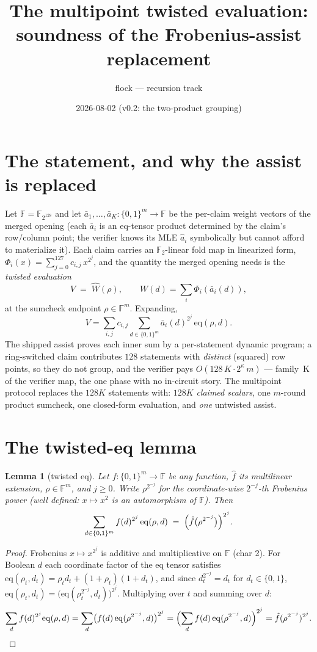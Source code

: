 \documentclass[11pt]{article}
\title{The multipoint twisted evaluation:\\ soundness of the Frobenius-assist replacement}
\author{flock — recursion track}
\date{2026-08-02 (v0.2: the two-product grouping)}
\newtheorem{lemma}{Lemma}
\newcommand{\F}{\mathbb{F}}
\newcommand{\eq}{\mathrm{eq}}
\begin{document}
\maketitle

\section{The statement, and why the assist is replaced}

Let $\F = \F_{2^{128}}$ and let $\bar a_1,\dots,\bar a_K : \{0,1\}^m \to \F$
be the per-claim weight vectors of the merged opening (each $\bar a_i$ is an
eq-tensor product determined by the claim's row/column point; the verifier
knows its MLE $\hat a_i$ symbolically but cannot afford to materialize it).
Each claim carries an $\F_2$-linear fold map in linearized form,
$\Phi_i(x) = \sum_{j=0}^{127} c_{i,j}\, x^{2^j}$, and the quantity the merged
opening needs is the \emph{twisted evaluation}
\[
  V \;=\; \widehat W(\rho), \qquad
  W(d) = \sum_i \Phi_i(\bar a_i(d)),
\]
at the sumcheck endpoint $\rho \in \F^m$. Expanding,
\[
  V = \sum_{i,j} c_{i,j} \sum_{d\in\{0,1\}^m} \bar a_i(d)^{2^j}\,\eq(\rho,d).
\]
The shipped assist proves each inner sum by a per-statement dynamic program;
a ring-switched claim contributes $128$ statements with \emph{distinct}
(squared) row points, so they do not group, and the verifier pays
$O(128\,K\cdot 2^{\kappa}\, m)$ — family~K of the verifier map, the one
phase with no in-circuit story. The multipoint protocol replaces the $128K$
statements with: $128K$ \emph{claimed scalars}, one $m$-round product
sumcheck, one closed-form evaluation, and \emph{one} untwisted assist.

\section{The twisted-eq lemma}

\begin{lemma}[twisted eq]\label{lem:twist}
Let $f:\{0,1\}^m\to\F$ be any function, $\hat f$ its multilinear extension,
$\rho\in\F^m$, and $j\ge 0$. Write $\rho^{2^{-j}}$ for the coordinate-wise
$2^{-j}$-th Frobenius power (well defined: $x\mapsto x^2$ is an automorphism
of $\F$). Then
\[
  \sum_{d\in\{0,1\}^m} f(d)^{2^j}\,\eq(\rho,d)
  \;=\;
  \Bigl(\hat f\bigl(\rho^{2^{-j}}\bigr)\Bigr)^{2^j}.
\]
\end{lemma}

\begin{proof}
Frobenius $x\mapsto x^{2^j}$ is additive and multiplicative on $\F$ (char
2). For Boolean $d$ each coordinate factor of the eq tensor satisfies
$\eq(\rho_t, d_t) = \rho_t d_t + (1+\rho_t)(1+d_t)$, and since
$d_t^{2^{-j}} = d_t$ for $d_t \in \{0,1\}$,
$\eq(\rho_t, d_t) = \bigl(\eq(\rho_t^{2^{-j}}, d_t)\bigr)^{2^j}$.
Multiplying over $t$ and summing over $d$:
\[
  \sum_d f(d)^{2^j} \eq(\rho,d)
  = \sum_d \bigl(f(d)\,\eq(\rho^{2^{-j}},d)\bigr)^{2^j}
  = \Bigl(\sum_d f(d)\,\eq(\rho^{2^{-j}},d)\Bigr)^{2^j}
  = \hat f(\rho^{2^{-j}})^{2^j}. \qedhere
\]
\end{proof}
\end{document}

